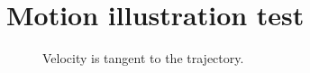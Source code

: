 \documentclass[11pt]{article}
\begin{document}
\section*{Motion illustration test}
\begin{figure}[H]
\centering

\caption{Velocity is tangent to the trajectory.}
\end{figure}
\end{document}
